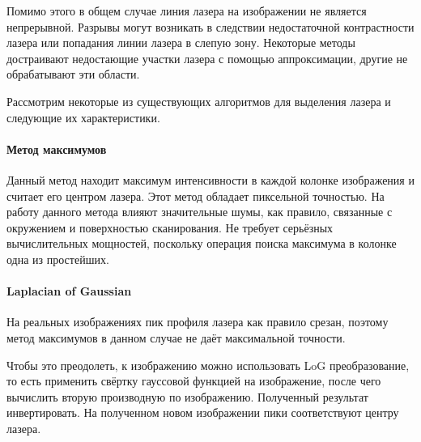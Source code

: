             Помимо этого в общем случае линия лазера на изображении не является непрерывной. Разрывы могут возникать в следствии недостаточной контрастности лазера или попадания линии лазера в слепую зону. Некоторые методы достраивают недостающие участки лазера с помощью аппроксимации, другие не обрабатывают эти области.
            
            Рассмотрим некоторые из существующих алгоритмов для выделения лазера и следующие их характеристики.
            
            
            \paragraph{Метод максимумов}
                Данный метод находит максимум интенсивности в каждой колонке изображения и считает его центром лазера. Этот метод обладает пиксельной точностью. На работу данного метода влияют значительные шумы, как правило, связанные с окружением и поверхностью сканирования. Не требует серьёзных вычислительных мощностей, поскольку операция поиска максимума в колонке одна из простейших.
            
            \paragraph{Laplacian of Gaussian}
                На реальных изображениях пик профиля лазера как правило срезан, поэтому метод максимумов в данном случае не даёт максимальной точности\cite{Molder2014}. 
                
                Чтобы это преодолеть, к изображению можно использовать LoG преобразование, то есть применить свёртку гауссовой функцией на изображение, после чего вычислить вторую производную по изображению. Полученный результат инвертировать. На полученном новом изображении пики соответствуют центру лазера. 
                
